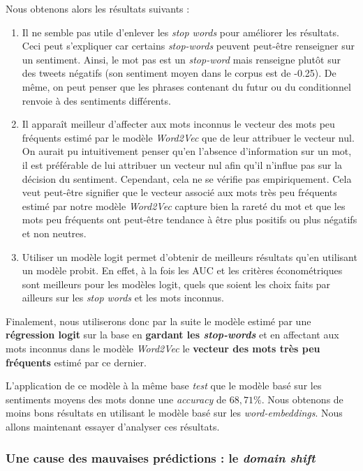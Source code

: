 \documentclass[11pt,french,french]{article}
\begin{document}
Nous obtenons alors les résultats suivants :

\begin{enumerate}
\def\labelenumi{\arabic{enumi}.}
\item
  Il ne semble pas utile d'enlever les \emph{stop words} pour améliorer
  les résultats. Ceci peut s'expliquer car certains \emph{stop-words}
  peuvent peut-être renseigner sur un sentiment. Ainsi, le mot \og pas
  \fg est un \emph{stop-word} mais renseigne plutôt sur des tweets
  négatifs (son sentiment moyen dans le corpus est de -0.25). De même,
  on peut penser que les phrases contenant du futur ou du conditionnel
  renvoie à des sentiments différents.
\item
  Il apparaît meilleur d'affecter aux mots inconnus le vecteur des mots
  peu fréquents estimé par le modèle \emph{Word2Vec} que de leur
  attribuer le vecteur nul. On aurait pu intuitivement penser qu'en
  l'absence d'information sur un mot, il est préférable de lui attribuer
  un vecteur nul afin qu'il n'influe pas sur la décision du sentiment.
  Cependant, cela ne se vérifie pas empiriquement. Cela veut peut-être
  signifier que le vecteur associé aux mots très peu fréquents estimé
  par notre modèle \emph{Word2Vec} capture bien la rareté du mot et que
  les mots peu fréquents ont peut-être tendance à être plus positifs ou
  plus négatifs et non neutres.
\item
  Utiliser un modèle logit permet d'obtenir de meilleurs résultats qu'en
  utilisant un modèle probit. En effet, à la fois les AUC et les
  critères économétriques sont meilleurs pour les modèles logit, quels
  que soient les choix faits par ailleurs sur les \emph{stop words} et
  les mots inconnus.
\end{enumerate}

Finalement, nous utiliserons donc par la suite le modèle estimé par une
\textbf{régression logit} sur la base en \textbf{gardant les
\emph{stop-words} } et en affectant aux mots inconnus dans le modèle
\emph{Word2Vec} le \textbf{vecteur des mots très peu fréquents} estimé
par ce dernier.

L'application de ce modèle à la même base \emph{test} que le modèle basé
sur les sentiments moyens des mots donne une \emph{accuracy} de
\(68,71\%\). Nous obtenons de moins bons résultats en utilisant le
modèle basé sur les \emph{word-embeddings}. Nous allons maintenant
essayer d'analyser ces résultats.

\subsubsection{\texorpdfstring{Une cause des mauvaises prédictions : le
\emph{domain
shift}}{Une cause des mauvaises prédictions : le domain shift}}\label{une-cause-des-mauvaises-pruxe9dictions-le-domain-shift}
\end{document}
